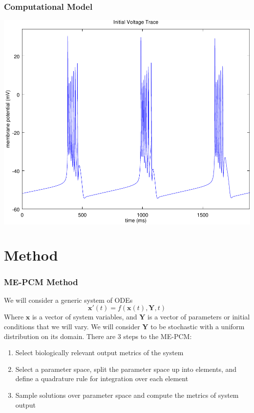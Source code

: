 \documentclass{beamer}
\theoremstyle{plain}
\theoremstyle{definition}
\begin{document}
 \begin{frame}\frametitle{Computational Model}
   \begin{center}
     \includegraphics[scale = .5]{initialTrace.pdf}
   \end{center}
 \end{frame}

 \section{Method}

 \begin{frame}\frametitle{ME-PCM Method}
   We will consider a generic system of ODEs
   \begin{equation*}
     \mathbf{x}'(t) = f(\mathbf{x}(t),\mathbf{Y},t)
   \end{equation*}
   Where $\mathbf{x}$ is a vector of system variables, and $\mathbf{Y}$ is a vector of parameters or initial conditions that we will vary. We will consider $\mathbf{Y}$ to be stochastic with a uniform distribution on its domain. There are 3 steps to the ME-PCM:
   \begin{enumerate}
     \item Select biologically relevant output metrics of the system
     \item Select a parameter space, split the parameter space up into elements, and define a quadrature rule for integration over each element
     \item Sample solutions over parameter space and compute the metrics of system output
   \end{enumerate}
 \end{frame}
\end{document}
